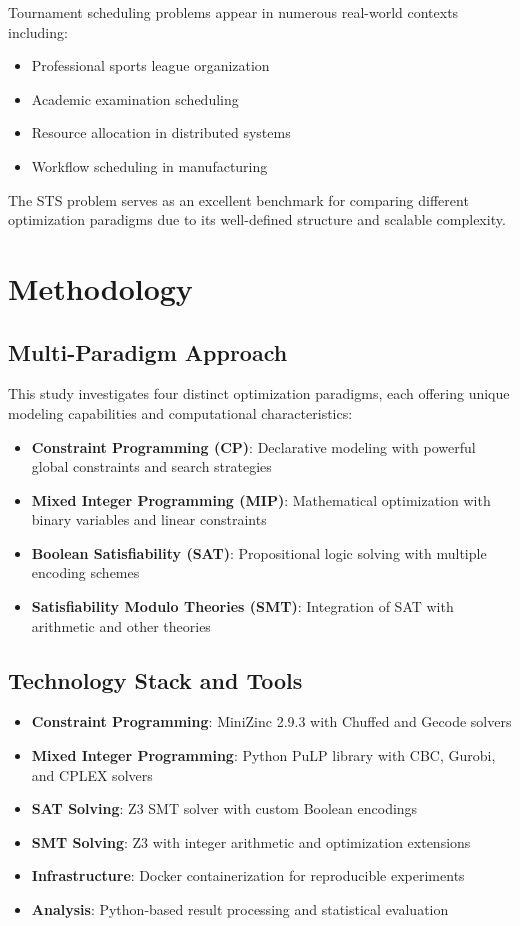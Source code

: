 \documentclass[11pt]{article}
\begin{document}
Tournament scheduling problems appear in numerous real-world contexts including:
\begin{itemize}
    \item Professional sports league organization
    \item Academic examination scheduling
    \item Resource allocation in distributed systems
    \item Workflow scheduling in manufacturing
\end{itemize}

The STS problem serves as an excellent benchmark for comparing different optimization paradigms due to its well-defined structure and scalable complexity.

\section{Methodology}

\subsection{Multi-Paradigm Approach}

This study investigates four distinct optimization paradigms, each offering unique modeling capabilities and computational characteristics:

\begin{itemize}
    \item \textbf{Constraint Programming (CP)}: Declarative modeling with powerful global constraints and search strategies
    \item \textbf{Mixed Integer Programming (MIP)}: Mathematical optimization with binary variables and linear constraints
    \item \textbf{Boolean Satisfiability (SAT)}: Propositional logic solving with multiple encoding schemes
    \item \textbf{Satisfiability Modulo Theories (SMT)}: Integration of SAT with arithmetic and other theories
\end{itemize}

\subsection{Technology Stack and Tools}

\begin{itemize}
    \item \textbf{Constraint Programming}: MiniZinc 2.9.3 with Chuffed and Gecode solvers
    \item \textbf{Mixed Integer Programming}: Python PuLP library with CBC, Gurobi, and CPLEX solvers
    \item \textbf{SAT Solving}: Z3 SMT solver with custom Boolean encodings
    \item \textbf{SMT Solving}: Z3 with integer arithmetic and optimization extensions
    \item \textbf{Infrastructure}: Docker containerization for reproducible experiments
    \item \textbf{Analysis}: Python-based result processing and statistical evaluation
\end{itemize}
\end{document}
